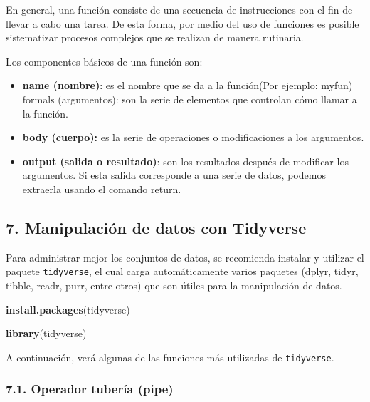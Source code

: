 \documentclass[
]{article}
\newenvironment{Shaded}{\begin{snugshade}}{\end{snugshade}}
\newcommand{\FunctionTok}[1]{\textcolor[rgb]{0.13,0.29,0.53}{\textbf{#1}}}
\newcommand{\NormalTok}[1]{#1}
\newcommand{\StringTok}[1]{\textcolor[rgb]{0.31,0.60,0.02}{#1}}
\providecommand{\tightlist}{%
  \setlength{\itemsep}{0pt}\setlength{\parskip}{0pt}}
\begin{document}
En general, una función consiste de una secuencia de instrucciones con
el fin de llevar a cabo una tarea. De esta forma, por medio del uso de
funciones es posible sistematizar procesos complejos que se realizan de
manera rutinaria.

Los componentes básicos de una función son:

\begin{itemize}
\tightlist
\item
  \textbf{name (nombre)}: es el nombre que se da a la función(Por
  ejemplo: myfun) formals (argumentos): son la serie de elementos que
  controlan cómo llamar a la función.
\item
  \textbf{body (cuerpo):} es la serie de operaciones o modificaciones a
  los argumentos.
\item
  \textbf{output (salida o resultado)}: son los resultados después de
  modificar los argumentos. Si esta salida corresponde a una serie de
  datos, podemos extraerla usando el comando return.
\end{itemize}

\subsection{7. Manipulación de datos con
Tidyverse}\label{manipulaciuxf3n-de-datos-con-tidyverse}

Para administrar mejor los conjuntos de datos, se recomienda instalar y
utilizar el paquete \texttt{tidyverse}, el cual carga automáticamente
varios paquetes (dplyr, tidyr, tibble, readr, purr, entre otros) que son
útiles para la manipulación de datos.

\begin{Shaded}
\begin{Highlighting}[]
\FunctionTok{install.packages}\NormalTok{(}\StringTok{\textquotesingle{}tidyverse\textquotesingle{}}\NormalTok{)}
\end{Highlighting}
\end{Shaded}

\begin{Shaded}
\begin{Highlighting}[]
\FunctionTok{library}\NormalTok{(tidyverse)}
\end{Highlighting}
\end{Shaded}

A continuación, verá algunas de las funciones más utilizadas de
\texttt{tidyverse}.

\subsubsection{7.1. Operador tubería
(pipe)}\label{operador-tuberuxeda-pipe}
\end{document}
